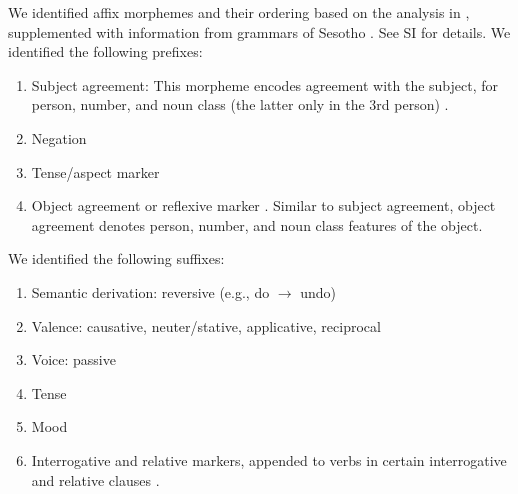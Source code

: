 We identified affix morphemes and their ordering based on the analysis in \cite{demuth1992acquisition}, supplemented with information from grammars of Sesotho \citep{doke1967textbook,guma1971outline}. See SI for details.
We identified the following prefixes:

\begin{enumerate}
    \item Subject agreement: This morpheme encodes agreement with the subject, for person, number, and noun class (the latter only in the 3rd person) \cite[]{doke1967textbook}.
    
    \item Negation \cite[]{doke1967textbook}
    
    \item Tense/aspect marker   \cite[--424]{doke1967textbook}
    
    \item Object agreement or reflexive marker \cite[]{doke1967textbook}. 
    Similar to subject agreement, object agreement denotes person, number, and noun class features of the object.
\end{enumerate}
We identified the following suffixes:
    
\begin{enumerate}
\item Semantic derivation: reversive (e.g., do $\rightarrow$ undo)  \cite[]{doke1967textbook}
    \item Valence: causative,  neuter/stative, applicative, reciprocal \cite[--338]{doke1967textbook}
    \item Voice: passive \cite[]{doke1967textbook} 
    \item Tense \cite[]{doke1967textbook}
    \item Mood \cite[--445]{doke1967textbook}
    \item Interrogative and relative markers, appended to verbs in certain interrogative and relative clauses \cite[, 271, 320, 714, 793]{doke1967textbook}.
\end{enumerate}





